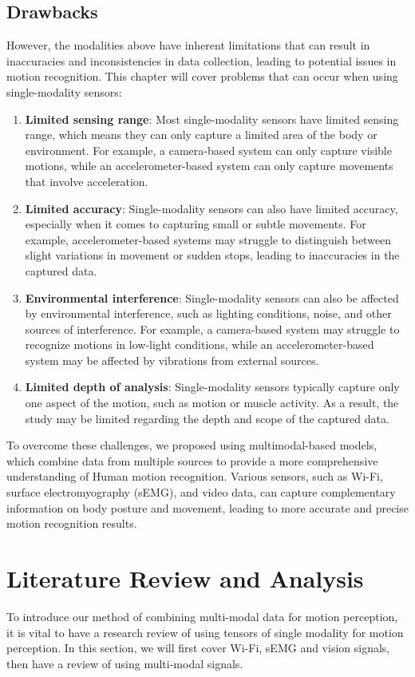 \documentclass[12pt, a4paper]{article}
\begin{document}
\subsection{Drawbacks}
However, the modalities above have inherent limitations that can result in inaccuracies and inconsistencies in data collection, leading to potential issues in motion recognition. This chapter will cover problems that can occur when using single-modality sensors:
\begin{enumerate}
	\item \textbf{Limited sensing range}: Most single-modality sensors have limited sensing range, which means they can only capture a limited area of the body or environment. For example, a camera-based system can only capture visible motions, while an accelerometer-based system can only capture movements that involve acceleration.
	\item \textbf{Limited accuracy}: Single-modality sensors can also have limited accuracy, especially when it comes to capturing small or subtle movements. For example, accelerometer-based systems may struggle to distinguish between slight variations in movement or sudden stops, leading to inaccuracies in the captured data.
	\item \textbf{Environmental interference}: Single-modality sensors can also be affected by environmental interference, such as lighting conditions, noise, and other sources of interference. For example, a camera-based system may struggle to recognize motions in low-light conditions, while an accelerometer-based system may be affected by vibrations from external sources.
	\item \textbf{Limited depth of analysis}: Single-modality sensors typically capture only one aspect of the motion, such as motion or muscle activity. As a result, the study may be limited regarding the depth and scope of the captured data.
\end{enumerate}

To overcome these challenges, we proposed using multimodal-based models, which combine data from multiple sources to provide a more comprehensive understanding of Human motion recognition. Various sensors, such as Wi-Fi, surface electromyography (sEMG), and video data, can capture complementary information on body posture and movement, leading to more accurate and precise motion recognition results.\\

\section{Literature Review and Analysis}
To introduce our method of combining multi-modal data for motion perception, it is vital to have a research review of using tensors of single modality for motion perception. In this section, we will first cover Wi-Fi, sEMG and vision signals, then have a review of using multi-modal signals.
\end{document}
